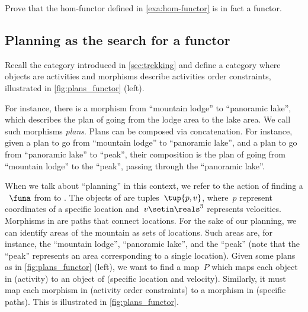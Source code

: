 \begin{gradedexercise}
    \label{ex:HomFunctor}
    Prove that the hom-functor defined in \cref{exa:hom-functor} is in fact a functor.
\end{gradedexercise}


\subsection{Planning as the search for a functor}
\label{sec:planning-as-functor}

\begin{example}
    \label{exa:planning-as-search-functor}
    Recall the category \Berg introduced in \cref{sec:trekking} and define a category \Plans where objects are activities and morphisms describe activities order constraints, illustrated in \cref{fig:plans_functor} (left).

    For instance, there is a morphism from ``mountain lodge'' to ``panoramic lake'', which describes the plan of going from the lodge area to the lake area.
    We call such morphisms \emph{plans}.
    Plans can be composed via concatenation.
    For instance, given a plan to go from ``mountain lodge'' to ``panoramic lake'', and a plan to go from ``panoramic lake'' to ``peak'', their composition is the plan of going from ``mountain lodge'' to the ``peak'', passing through the ``panoramic lake''.

    When we talk about ``planning'' in this context, we refer to the action of finding a ~$\funa$ from \Plans to \Berg.
    The objects of \Berg are tuples~$\tup{p,v}$, where~$p$ represent coordinates of a specific location and~$v\setin \reals^3$ represents velocities.
    Morphisms in \Berg are paths that connect locations.
    For the sake of our planning, we can identify areas of the mountain as sets of locations.
    Such areas are, for instance, the ``mountain lodge'', ``panoramic lake'', and the
    ``peak'' (note that the ``peak'' represents an area corresponding to a single location).
    Given some plans as in \cref{fig:plans_functor} (left), we want to find a map~$P$ which maps each object in \Plans (activity) to an object of \Berg (specific location and velocity).
    Similarly, it must map each morphism in \Plans (activity order constraints) to a morphism in \Berg (specific paths).
    This is illustrated in \cref{fig:plans_functor}.
\end{example}

